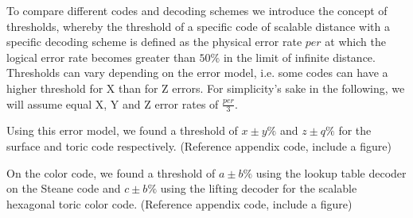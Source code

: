 To compare different codes and decoding schemes
we introduce the concept of thresholds, whereby the threshold
of a specific code of scalable distance with a specific decoding 
scheme is defined as the physical error rate $per$ at which the logical
error rate becomes greater than $50\%$ in the limit of infinite 
distance. \\
Thresholds can vary depending on the error model, i.e. 
some codes can have a higher threshold for X than for Z errors.
For simplicity's sake in the following, we will assume equal 
X, Y and Z error rates of $\frac{per}{3}$.

Using this error model, we found a threshold of $x\pm y \%$ and
$z\pm q\%$ for the surface and toric code respectively. 
(Reference appendix code, include a figure)

On the color code, we found a threshold of $a\pm b\%$ using the 
lookup table decoder on the Steane code and $c\pm b\%$ using the 
lifting decoder for the scalable hexagonal toric color code. 
(Reference appendix code, include a figure)